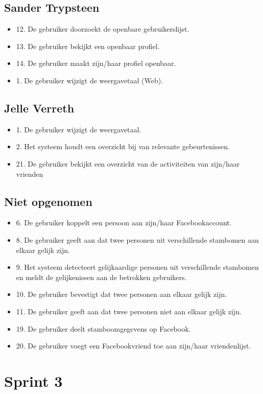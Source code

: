 \documentclass[pdftex,a4paper,12pt,twoside]{report}
\begin{document}
\subsection{Sander Trypsteen}
\begin{itemize}
\item 12. De gebruiker doorzoekt de openbare gebruikerslijst. 
\item 13. De gebruiker bekijkt een openbaar profiel. 
\item 14. De gebruiker maakt zijn/haar profiel openbaar. 
\item 1. De gebruiker wijzigt de weergavetaal (Web).
\end{itemize}

\subsection{Jelle Verreth}
\begin{itemize}
\item 1. De gebruiker wijzigt de weergavetaal. 
\item 2. Het systeem houdt een overzicht bij van relevante gebeurtenissen. 
\item 21. De gebruiker bekijkt een overzicht van de activiteiten van zijn/haar vrienden
\end{itemize}
\subsection{Niet opgenomen}
\begin{itemize}
\item 6. De gebruiker koppelt een persoon aan zijn/haar Facebookaccount. 
\item 8. De gebruiker geeft aan dat twee personen uit verschillende stambomen aan elkaar gelijk zijn. 
\item 9. Het systeem detecteert gelijkaardige personen uit verschillende stambomen en meldt de 
gelijkenissen aan de betrokken gebruikers. 
\item 10. De gebruiker bevestigt dat twee personen aan elkaar gelijk zijn. 
\item 11. De gebruiker geeft aan dat twee personen niet aan elkaar gelijk zijn.
\item 19. De gebruiker deelt stamboomgegevens op Facebook. 
\item 20. De gebruiker voegt een Facebookvriend toe aan zijn/haar vriendenlijst. 
\end{itemize}
\newpage
\section{Sprint 3}
\end{document}
